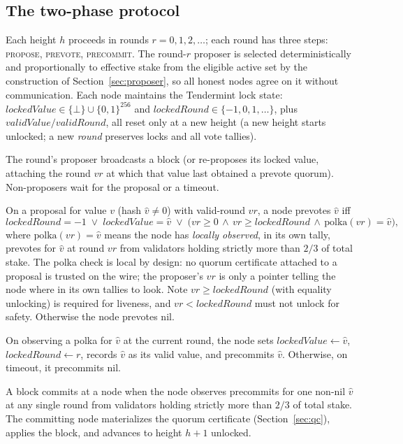 \documentclass[11pt]{article}
\theoremstyle{plain}
\theoremstyle{definition}
\theoremstyle{remark}
\begin{document}
\subsection{The two-phase protocol}
\label{sec:twophase}

Each height $h$ proceeds in rounds $r = 0, 1, 2, \dots$; each round has three
steps: \textsc{propose}, \textsc{prevote}, \textsc{precommit}. The round-$r$
proposer is selected deterministically and proportionally to effective stake
from the eligible active set by the construction of
Section~\ref{sec:proposer}, so all honest nodes agree on it without
communication. Each node
maintains the Tendermint lock state: $\mathit{lockedValue} \in
\{\bot\} \cup \{0,1\}^{256}$ and $\mathit{lockedRound} \in \{-1, 0, 1, \dots\}$,
plus $\mathit{validValue}/\mathit{validRound}$, all reset only at a new
height (a new height starts unlocked; a new \emph{round} preserves locks and
all vote tallies).

\begin{description}[leftmargin=1.6em, style=nextline]
\item[\textsc{propose}.] The round's proposer broadcasts a block (or
  re-proposes its locked value, attaching the round $vr$ at which that value
  last obtained a prevote quorum). Non-proposers wait for the proposal or a
  timeout.
\item[\textsc{prevote}.] On a proposal for value $v$ (hash $\hat{v} \ne 0$)
  with valid-round $vr$, a node prevotes $\hat{v}$ iff
  \[
  \mathit{lockedRound} = -1
  \;\lor\; \mathit{lockedValue} = \hat{v}
  \;\lor\; \big( vr \ge 0 \,\land\, vr \ge \mathit{lockedRound} \,\land\,
  \mathrm{polka}(vr) = \hat{v} \big),
  \]
  where $\mathrm{polka}(vr) = \hat{v}$ means the node has \emph{locally
  observed}, in its own tally, prevotes for $\hat{v}$ at round $vr$ from
  validators holding strictly more than $2/3$ of total stake. The polka check
  is local by design: no quorum certificate attached to a proposal is
  trusted on the wire; the proposer's $vr$ is only a pointer telling the node
  where in its own tallies to look. Note $vr \ge \mathit{lockedRound}$ (with
  equality unlocking) is required for liveness, and $vr < \mathit{lockedRound}$
  must not unlock for safety. Otherwise the node prevotes nil.
\item[\textsc{precommit}.] On observing a polka for $\hat{v}$ at the current
  round, the node sets $\mathit{lockedValue} \gets \hat{v}$,
  $\mathit{lockedRound} \gets r$, records $\hat{v}$ as its valid value, and
  precommits $\hat{v}$. Otherwise, on timeout, it precommits nil.
\item[\textsc{commit}.] A block commits at a node when the node observes
  precommits for one non-nil $\hat{v}$ at any single round from validators
  holding strictly more than $2/3$ of total stake. The committing node
  materializes the quorum certificate (Section~\ref{sec:qc}), applies the
  block, and advances to height $h+1$ unlocked.
\end{description}
\end{document}
